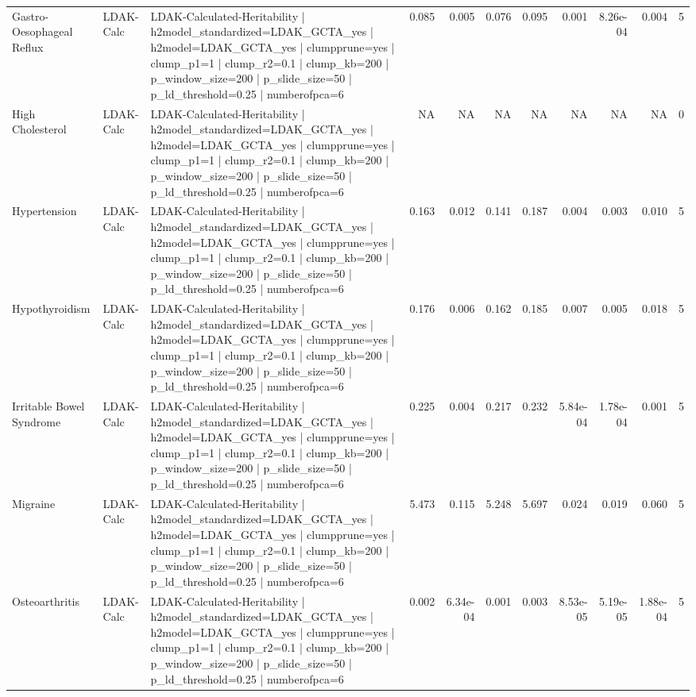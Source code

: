 \begin{landscape}
\begin{longtable}{p{2.4cm}p{1.8cm}p{6.0cm}rrrrrrrr}
Gastro-Oesophageal Reflux & LDAK-Calc & LDAK-Calculated-Heritability | h2model\_standardized=LDAK\_GCTA\_yes | h2model=LDAK\_GCTA\_yes | clumpprune=yes | clump\_p1=1 | clump\_r2=0.1 | clump\_kb=200 | p\_window\_size=200 | p\_slide\_size=50 | p\_ld\_threshold=0.25 | numberofpca=6 & 0.085 & 0.005 & 0.076 & 0.095 & 0.001 & 8.26e-04 & 0.004 & 5 \\
High Cholesterol & LDAK-Calc & LDAK-Calculated-Heritability | h2model\_standardized=LDAK\_GCTA\_yes | h2model=LDAK\_GCTA\_yes | clumpprune=yes | clump\_p1=1 | clump\_r2=0.1 | clump\_kb=200 | p\_window\_size=200 | p\_slide\_size=50 | p\_ld\_threshold=0.25 | numberofpca=6 & NA & NA & NA & NA & NA & NA & NA & 0 \\
Hypertension & LDAK-Calc & LDAK-Calculated-Heritability | h2model\_standardized=LDAK\_GCTA\_yes | h2model=LDAK\_GCTA\_yes | clumpprune=yes | clump\_p1=1 | clump\_r2=0.1 | clump\_kb=200 | p\_window\_size=200 | p\_slide\_size=50 | p\_ld\_threshold=0.25 | numberofpca=6 & 0.163 & 0.012 & 0.141 & 0.187 & 0.004 & 0.003 & 0.010 & 5 \\
Hypothyroidism & LDAK-Calc & LDAK-Calculated-Heritability | h2model\_standardized=LDAK\_GCTA\_yes | h2model=LDAK\_GCTA\_yes | clumpprune=yes | clump\_p1=1 | clump\_r2=0.1 | clump\_kb=200 | p\_window\_size=200 | p\_slide\_size=50 | p\_ld\_threshold=0.25 | numberofpca=6 & 0.176 & 0.006 & 0.162 & 0.185 & 0.007 & 0.005 & 0.018 & 5 \\
Irritable Bowel Syndrome & LDAK-Calc & LDAK-Calculated-Heritability | h2model\_standardized=LDAK\_GCTA\_yes | h2model=LDAK\_GCTA\_yes | clumpprune=yes | clump\_p1=1 | clump\_r2=0.1 | clump\_kb=200 | p\_window\_size=200 | p\_slide\_size=50 | p\_ld\_threshold=0.25 | numberofpca=6 & 0.225 & 0.004 & 0.217 & 0.232 & 5.84e-04 & 1.78e-04 & 0.001 & 5 \\
Migraine & LDAK-Calc & LDAK-Calculated-Heritability | h2model\_standardized=LDAK\_GCTA\_yes | h2model=LDAK\_GCTA\_yes | clumpprune=yes | clump\_p1=1 | clump\_r2=0.1 | clump\_kb=200 | p\_window\_size=200 | p\_slide\_size=50 | p\_ld\_threshold=0.25 | numberofpca=6 & 5.473 & 0.115 & 5.248 & 5.697 & 0.024 & 0.019 & 0.060 & 5 \\
Osteoarthritis & LDAK-Calc & LDAK-Calculated-Heritability | h2model\_standardized=LDAK\_GCTA\_yes | h2model=LDAK\_GCTA\_yes | clumpprune=yes | clump\_p1=1 | clump\_r2=0.1 | clump\_kb=200 | p\_window\_size=200 | p\_slide\_size=50 | p\_ld\_threshold=0.25 | numberofpca=6 & 0.002 & 6.34e-04 & 0.001 & 0.003 & 8.53e-05 & 5.19e-05 & 1.88e-04 & 5 \\

\end{longtable}
\end{landscape}
